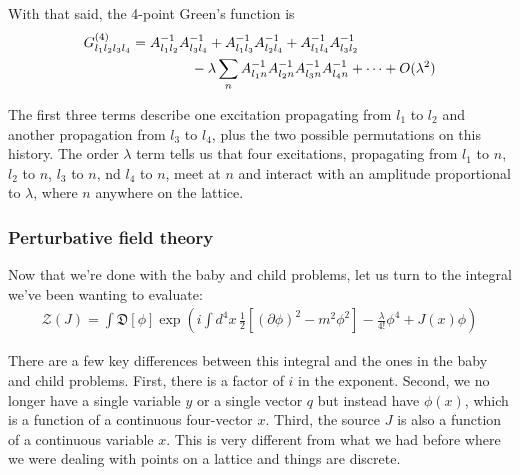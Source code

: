 \documentclass{book}
\theoremstyle{definition}
\newcommand{\p}{\partial}
\newcommand{\f}[2]{\frac{#1}{#2}}
\newcommand{\lp}{\left(}
\newcommand{\rp}{\right)}
\newcommand{\lb}{\left[}
\newcommand{\rb}{\right]}
\newcommand{\Z}{\mathcal{Z}}
\begin{document}
With that said, the 4-point Green's function is
\begin{align}
G^{(4)}_{l_1l_2l_3l_4} &= A^{-1}_{l_1l_2}A^{-1}_{l_3l_4} + A^{-1}_{l_1l_3}A^{-1}_{l_2l_4} + A^{-1}_{l_1l_4}A^{-1}_{l_3l_2} \nonumber\\
&\hspace{1.5cm}-\lambda \sum_n A^{-1}_{l_1n}A^{-1}_{l_2n}A^{-1}_{l_3n}A^{-1}_{l_4n} + \dots + O(\lambda^2)
\end{align}

The first three terms describe one excitation propagating from $l_1$ to $l_2$ and another propagation from $l_3$ to $l_4$, plus the two possible permutations on this history. The order $\lambda$ term tells us that four excitations, propagating from $l_1$ to $n$, $l_2$ to $n$, $l_3$ to $n$, nd $l_4$ to $n$, meet at $n$ and interact with an amplitude proportional to $\lambda$, where $n$ anywhere on the lattice. 


























\subsubsection{Perturbative field theory}



Now that we're done with the baby and child problems, let us turn to the integral we've been wanting to evaluate:
\begin{align}
\boxed{\Z(J) = \int \mathfrak{D}[\phi] \exp\lp i\int d^4x\,  \f{1}{2}\lb(\p \phi)^2 - m^2 \phi^2 \rb - \f{\lambda}{4!}\phi^4 + J(x)\phi \rp}
\end{align}

There are a few key differences between this integral and the ones in the baby and child problems. First, there is a factor of $i$ in the exponent. Second, we no longer have a single variable $y$ or a single vector $q$ but instead have $\phi(x)$, which is a function of a continuous four-vector $x$. Third, the source $J$ is also a function of a continuous variable $x$. This is very different from what we had before where we were dealing with points on a lattice and things are discrete. \\
\end{document}
